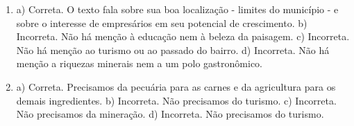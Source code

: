 \begin{enumerate}
\item
a) Correta. O texto fala sobre sua boa localização - limites do
município - e sobre o interesse de empresários em seu potencial de
crescimento.
b) Incorreta. Não há menção à educação nem à beleza da paisagem.
c) Incorreta. Não há menção ao turismo ou ao passado do bairro.
d) Incorreta. Não há menção a riquezas minerais nem a um polo
gastronômico.

\item
a) Correta. Precisamos da pecuária para as carnes e da agricultura para
os demais ingredientes.
b) Incorreta. Não precisamos do turismo.
c) Incorreta. Não precisamos da mineração.
d) Incorreta. Não precisamos do turismo.
\end{enumerate}

